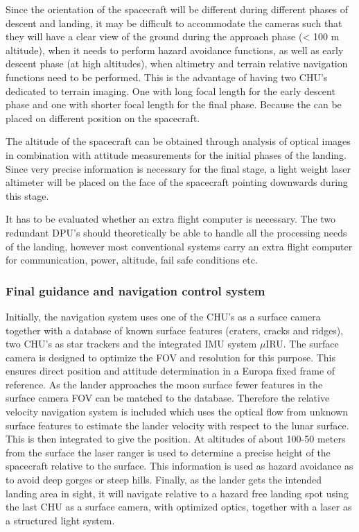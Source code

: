 Since the orientation of the spacecraft will be different during different phases of descent and landing, it may be difficult to accommodate the cameras such that they will have a clear view of the ground during the approach phase (< 100 m altitude), when it needs to perform hazard avoidance functions, as well as early descent phase (at high altitudes), when altimetry and terrain relative navigation functions need to be performed. This is the advantage of having two CHU's dedicated to terrain imaging. One with long focal length for the early descent phase and one with shorter focal length for the final phase. Because the can be placed on different position on the spacecraft.

The altitude of the spacecraft can be obtained through analysis of optical images in combination with attitude measurements for the initial phases of the landing. Since very precise information is necessary for the final stage, a light weight laser altimeter will be placed on the face of the spacecraft pointing downwards during this stage. 

It has to be evaluated whether an extra flight computer is necessary. The two redundant DPU's should theoretically be able to handle all the processing needs of the landing, however most conventional systems carry an extra flight computer for communication, power, altitude, fail safe conditions etc.

 
\subsubsection{Final guidance and navigation control system}
Initially, the navigation system uses one of the CHU's as a surface camera together with a database of known surface
features (craters, cracks and ridges), two CHU's as star trackers and the integrated IMU system $\mu$IRU. The surface camera is designed to optimize the FOV and resolution for this purpose. This ensures direct position and attitude determination in a Europa fixed frame of reference.
As the lander approaches the moon surface fewer features in the surface camera FOV
can be matched to the database. Therefore the relative velocity navigation system is included
which uses the optical flow from unknown surface features to estimate
the lander velocity with respect to the lunar surface. This is then integrated to give the
position. At altitudes of about 100-50 meters from the surface the laser ranger is used to determine a precise height of the spacecraft relative to the surface. This information is used as hazard avoidance as to avoid deep gorges or steep hills. Finally, as the lander gets the intended landing area in sight, it will navigate
relative to a hazard free landing spot using the last CHU as a surface camera, with optimized optics, together with a laser as a structured light system. 

